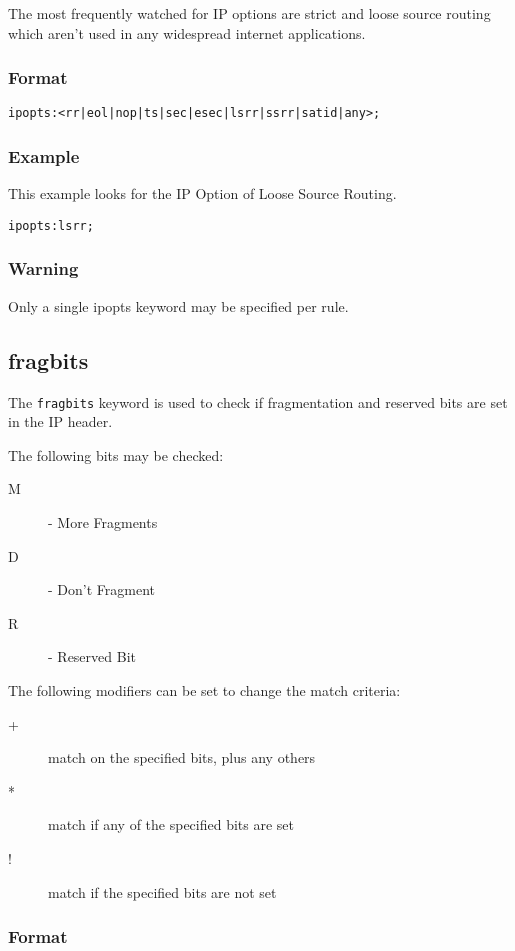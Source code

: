 \documentclass[english]{report}
\begin{document}
The most frequently watched for IP options are strict and loose source
routing which aren't used in any widespread internet applications.


\subsubsection{Format}

\begin{verbatim}
ipopts:<rr|eol|nop|ts|sec|esec|lsrr|ssrr|satid|any>;
\end{verbatim}

\subsubsection{Example}
This example looks for the IP Option of Loose Source Routing.
\begin{verbatim}
ipopts:lsrr;
\end{verbatim}

\subsubsection{Warning}
Only a single ipopts keyword may be specified per rule.

\subsection{fragbits}

The \texttt{fragbits} keyword is used to check if fragmentation and reserved bits are set in the IP header.

The following bits may be checked:
\begin{description}
\item [M] - More Fragments
\item [D] - Don't Fragment
\item [R] - Reserved Bit
\end{description}

The following modifiers can be set to change the match criteria:
\begin{description}
\item [+] match on the specified bits, plus any others
\item [*] match if any of the specified bits are set
\item [!] match if the specified bits are not set
\end{description}

\subsubsection{Format}
\end{document}
